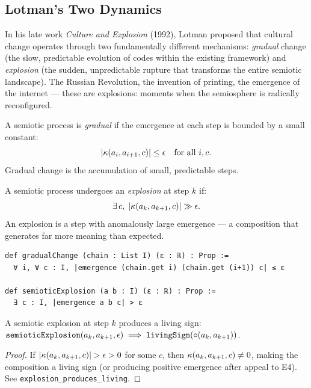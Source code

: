 \subsection{Lotman's Two Dynamics}

In his late work \textit{Culture and Explosion} (1992), Lotman
proposed that cultural change operates through two fundamentally
different mechanisms: \emph{gradual} change (the slow, predictable
evolution of codes within the existing framework) and \emph{explosion}
(the sudden, unpredictable rupture that transforms the entire
semiotic landscape). The Russian Revolution, the invention of
printing, the emergence of the internet --- these are explosions:
moments when the semiosphere is radically reconfigured.

\begin{definition}
\label{def:gradual-change}
A semiotic process is \emph{gradual} if the emergence at each step
is bounded by a small constant:
\[
  |\kappa(a_i, a_{i+1}, c)| \leq \epsilon \quad \text{for all } i, c.
\]
Gradual change is the accumulation of small, predictable steps.
\end{definition}

\begin{definition}
\label{def:explosion}
A semiotic process undergoes an \emph{explosion} at step $k$ if:
\[
  \exists\, c,\; |\kappa(a_k, a_{k+1}, c)| \gg \epsilon.
\]
An explosion is a step with anomalously large emergence --- a
composition that generates far more meaning than expected.
\end{definition}

\begin{lstlisting}[caption={Gradual change and explosion}]
def gradualChange (chain : List I) (ε : ℝ) : Prop :=
  ∀ i, ∀ c : I, |emergence (chain.get i) (chain.get (i+1)) c| ≤ ε

def semioticExplosion (a b : I) (ε : ℝ) : Prop :=
  ∃ c : I, |emergence a b c| > ε
\end{lstlisting}

\begin{theorem}
\label{thm:explosion-living}
A semiotic explosion at step $k$ produces a living sign:
$\texttt{semioticExplosion}(a_k, a_{k+1}, \epsilon) \implies
\texttt{livingSign}(\circ(a_k, a_{k+1}))$.
\end{theorem}

\begin{proof}
If $|\kappa(a_k, a_{k+1}, c)| > \epsilon > 0$ for some $c$, then
$\kappa(a_k, a_{k+1}, c) \neq 0$, making the composition a living
sign (or producing positive emergence after appeal to E4). See
\texttt{explosion\_produces\_living}.
\end{proof}

